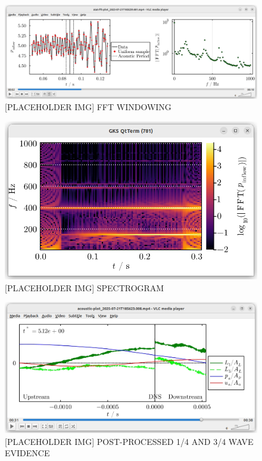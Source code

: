 \begin{figure}[t]
\centering
\includegraphics[scale=0.35]{assets/graphs/fft-windowing.png}
\caption{[PLACEHOLDER IMG] FFT WINDOWING}
\label{fig:windowing}
\end{figure}

\begin{figure}[t]
\centering
\includegraphics[scale=0.35]{assets/graphs/spectrogram.png}
\caption{[PLACEHOLDER IMG] SPECTROGRAM}
\label{fig:spectrogram}
\end{figure}

\begin{figure}[t]
\centering
\includegraphics[scale=0.35]{assets/graphs/pp-tones.png}
\caption{[PLACEHOLDER IMG] POST-PROCESSED 1/4 AND 3/4 WAVE EVIDENCE}
\label{fig:pp-tones}
\end{figure}



